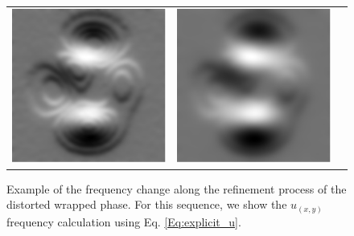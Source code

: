 \begin{figure}[Ht!]
\begin{center}
\begin{tabular}{c c c}
      \includegraphics[scale=0.45]{Chpt4_figures/Fig_frecuencias2.eps}&
      \includegraphics[scale=0.45]{Chpt4_figures/Fig_frecuencias3.eps}\\
    \end{tabular}
  \end{center}
  \caption{Example of the frequency change along the refinement process of the 
  distorted wrapped phase. For this sequence, we show the $u_(x,y)$ frequency 
  calculation using Eq. \ref{Eq:explicit_u}.}
  \label{fig:frecuencias}
\end{figure}

